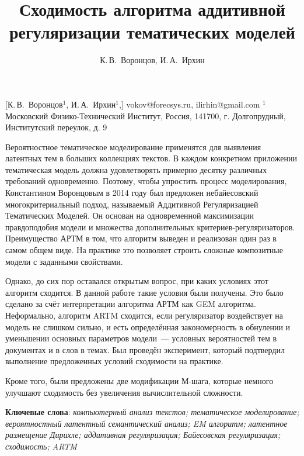 \documentclass[12pt, twoside]{article}
\begin{document}
\title
    {Сходимость алгоритма аддитивной регуляризации тематических моделей}
\author
    { К.\,В.~Воронцов, И.\,А.~Ирхин}
    [К.\,В.~Воронцов$^{1}$, И.\,А.~Ирхин$^1$,]
\email
{vokov@forecsys.ru, ilirhin@gmail.com}
\organization
    {$^1$Московский Физико-Технический Институт, Россия, 141700, г. Долгопрудный, Институтский переулок, д. 9}
\abstract
{
Вероятностное тематическое моделирование применятся для выявления  латентных тем в больших коллекциях текстов. В каждом конкретном приложении тематическая модель должна удовлетворять примерно десятку различных требований одновременно. Поэтому, чтобы упростить процесс моделирования, Константином Воронцовым в 2014 году был предложен небайесовский многокритериальный подход, называемый Аддитивной Регуляризацией Тематических Моделей. Он основан на одновременной максимизации правдоподобия модели и множества дополнительных критериев-регуляризаторов. Преимущество АРТМ в том, что алгоритм выведен и реализован один раз в самом общем виде. На практике это позволяет строить сложные композитные модели с заданными свойствами.

Однако, до сих пор оставался открытым вопрос, при каких условиях этот алгоритм сходится. В данной работе такие условия были получены. Это было сделано за счёт интерпретации алгоритма АРТМ как GEM алгоритма. Неформально, алгоритм ARTM сходится, если регуляризатор воздействует на модель не слишком сильно, и есть определённая закономерность в обнулении и уменьшении основных параметров модели~--- условных вероятностей тем в документах и в слов в темах. Был проведён эксперимент, который подтвердил выполнение предложенных условий сходимости на практике.

 Кроме того, были предложены две модификации М-шага, которые немного улучшают сходимость без увеличения вычислительной сложности. 	
\bigskip

\noindent
\textbf{Ключевые слова}: \emph { компьютерный анализ текстов; тематическое моделирование; вероятностный латентный семантический анализ; EM алгоритм; латентное размещение Дирихле; аддитивная регуляризация; Байесовская регуляризация; сходимость; ARTM}
}
\end{document}
